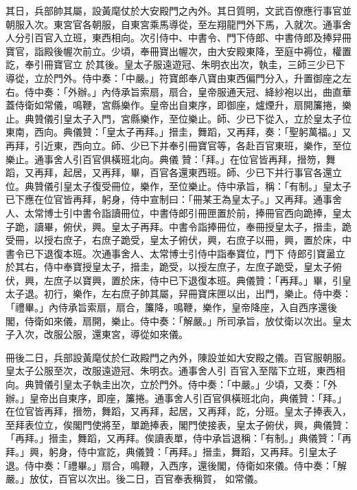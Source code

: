 \begin{pinyinscope}
 其日，兵部帥其屬，設黃麾仗於大安殿門之內外。其日質明，文武百僚應行事官並朝服入次。東宮官各朝服，自東宮乘馬導從，至左翔龍門外下馬，入就次。通事舍人分引百官入立班，東西相向。次引侍中、中書令、門下侍郎、中書侍郎及捧舁冊寶官，詣殿後幄次前立。少頃，奉冊寶出幄次，由大安殿東降，至庭中褥位，權置訖，奉引冊寶官立
 於其後。皇太子服遠遊冠、朱明衣出次，執圭，三師三少已下導從，立於門外。侍中奏：「中嚴。」符寶郎奉八寶由東西偏門分入，升置御座之左右。侍中奏：「外辦。」內侍承旨索扇，扇合，皇帝服通天冠、絳紗袍以出，曲直華蓋侍衛如常儀，鳴鞭，宮縣樂作。皇帝出自東序，即御座，爐煙升，扇開簾捲，樂止。典贊儀引皇太子入門，宮縣樂作，至位樂止。師、少已下從入，立於皇太子位東南，西向。典儀贊：「皇太子再拜。」搢圭，舞蹈，又再拜，奏：「聖躬萬福。」又再拜，引近東，西向立。師、少已下并奉引冊寶官等，各赴百官東班，樂作，至位樂止。通事舍人引百官俱橫班北向。典儀
 贊：「拜。」在位官皆再拜，搢笏，舞蹈，又再拜，起居，又再拜，畢，百官各還東西班。師、少已下并行事官各還立位。典贊儀引皇太子復受冊位，樂作，至位樂止。侍中承旨，稱：「有制。」皇太子已下應在位官皆再拜，躬身，侍中宣制曰：「冊某王為皇太子。」又再拜。通事舍人、太常博士引中書令詣讀冊位，中書侍郎引冊匣置於前，捧冊官西向跪捧，皇太子跪，讀畢，俯伏，興。皇太子再拜。中書令詣捧冊位，奉冊授皇太子，搢圭，跪受冊，以授右庶子，右庶子跪受，皇太子俯伏，興，右庶子以冊，興，置於床，中書令已下退復本班。次通事舍人、太常博士引侍中詣奉寶位，門下
 侍郎引寶盝立於其右，侍中奉寶授皇太子，搢圭，跪受，以授左庶子，左庶子跪受，皇太子俯伏，興，左庶子以寶興，置於床，侍中已下退復本班。典儀贊：「再拜。」畢，引皇太子退。初行，樂作，左右庶子帥其屬，舁冊寶床匣以出，出門，樂止。侍中奏：「禮畢。」內侍承旨索扇，扇合，簾降，鳴鞭，樂作，皇帝降座，入自西序還後閣，侍衛如來儀，扇開，樂止。侍中奏：「解嚴。」所司承旨，放仗衛以次出。皇太子入次，改服公服，還東宮，導從如來儀。



 冊後二日，兵部設黃麾仗於仁政殿門之內外，陳設並如大安殿之儀。百官服朝服。皇太子公服至次，改服遠遊冠、朱明衣。通事舍人引
 百官入至階下立班，東西相向。典贊儀引皇太子執圭出次，立於門外。侍中奏：「中嚴。」少頃，又奏：「外辦。」皇帝出自東序，即座，簾捲。通事舍人引百官俱橫班北向，典儀贊：「拜。」在位官皆再拜，搢笏，舞蹈，又再拜，起居，又再拜，訖，分班。皇太子捧表入，至拜表位立，俟閣門使將至，單跪捧表，閣門使接表，皇太子俯伏，興，典儀贊：「再拜。」搢圭，舞蹈，又再拜。俟讀表單，侍中承旨退稱：「有制。」典儀贊：「再拜。」興，躬身，侍中宣訖，典儀贊：「再拜。」搢圭，舞蹈，又再拜。引皇太子退。侍中奏：「禮畢。」扇合，鳴鞭，入西序，還後閣，侍衛如來儀。侍中奏：「解嚴。」放仗，百官以次出。後二日，百官奉表稱賀，
 如常儀。




\end{pinyinscope}
